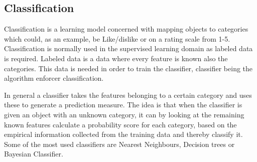\subsection{Classification}
Classification is a learning model concerned with mapping objects to categories which could, as an example, be Like/dislike or on a rating scale from 1-5. Classification is normally used in the supervised learning domain as labeled data is required. Labeled data is a data where every feature is known also the categories. This data is needed in order to train the classifier, classifier being the algorithm enforcer classification. 

In general a classifier takes the features belonging to a certain category and uses these to generate a prediction measure. The idea is that when the classifier is given an object with an unknown category, it can by looking at the remaining known features calculate a probability score for each category, based on the empirical information collected from the training data and thereby classify it. Some of the most used classifiers are Nearest Neighbours, Decision trees or Bayesian Classifier. 